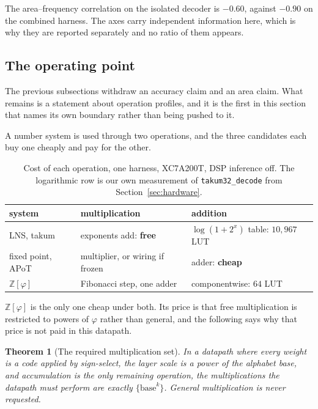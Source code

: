 \documentclass[11pt]{article}
\newtheorem{theorem}{Theorem}
\theoremstyle{definition}
\begin{document}
The area--frequency correlation on the isolated decoder is $-0.60$, against
$-0.90$ on the combined harness. The axes carry independent information here,
which is why they are reported separately and no ratio of them appears.


\subsection{The operating point}
\label{sec:operatingpoint}

The previous subsections withdraw an accuracy claim and an area claim. What
remains is a statement about operation profiles, and it is the first in this
section that names its own boundary rather than being pushed to it.

A number system is used through two operations, and the three candidates each buy
one cheaply and pay for the other.

\begin{table}[t]\centering
\caption{Cost of each operation, one harness, XC7A200T, DSP inference off. The
logarithmic row is our own measurement of \texttt{takum32\_decode} from
Section~\ref{sec:hardware}.}
\label{tab:bothops}
\begin{tabular}{lll}
\toprule
system & multiplication & addition \\
\midrule
LNS, takum & exponents add: \textbf{free} & $\log(1{+}2^{x})$ table: $10{,}967$ LUT \\
fixed point, APoT & multiplier, or wiring if frozen & adder: \textbf{cheap} \\
$\mathbb{Z}[\varphi]$ & Fibonacci step, one adder & componentwise: $64$ LUT \\
\bottomrule
\end{tabular}
\end{table}

$\mathbb{Z}[\varphi]$ is the only one cheap under both. Its price is that free
multiplication is restricted to powers of $\varphi$ rather than general, and the
following says why that price is not paid in this datapath.

\begin{theorem}[The required multiplication set]
\label{thm:reqmul}
In a datapath where every weight is a code applied by sign-select, the layer
scale is a power of the alphabet base, and accumulation is the only remaining
operation, the multiplications the datapath must perform are exactly
$\{\text{base}^{k}\}$. General multiplication is never requested.
\end{theorem}
\end{document}
